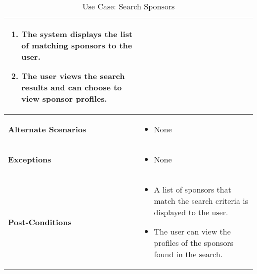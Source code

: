 \begin{table}[!ht]
\begin{tabularx}{\textwidth}{|l|X|}
\begin{enumerate}[label=\arabic*.,itemsep=0pt]
            \item The system displays the list of matching sponsors to the user.
            \item The user views the search results and can choose to view sponsor profiles.
        \end{enumerate} \\
        \hline
        \textbf{Alternate Scenarios} & 
        \begin{itemize}[label=--,itemsep=0pt]
            \item None
        \end{itemize} \\
        \hline
        \textbf{Exceptions} & 
        \begin{itemize}[label=--,itemsep=0pt]
            \item None
        \end{itemize} \\
        \hline
        \textbf{Post-Conditions} & 
        \begin{itemize}[label=--,itemsep=0pt]
            \item A list of sponsors that match the search criteria is displayed to the user.
            \item The user can view the profiles of the sponsors found in the search.
        \end{itemize} \\
        \hline
    \end{tabularx}
    \caption{Use Case: Search Sponsors}
    \label{tab:use-case-search-sponsors}
\end{table}



